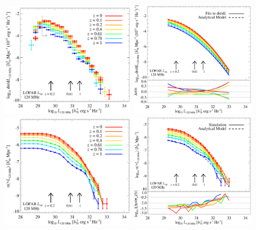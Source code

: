 \documentclass[traditabstract]{aa}
\begin{document}
\begin{figure}[hbt!]
\centering
\includegraphics[width=0.5\textwidth,height=0.305\textheight]{figures/RLF_LOFAR.eps}
\includegraphics[width=0.47\textwidth,height=0.3\textheight]{figures/RLF_LOFAR_analytical_1.eps}
\includegraphics[width=0.5\textwidth,height=0.305\textheight]{figures/CumDensityL_LOFAR.eps}
\includegraphics[width=0.47\textwidth,height=0.3\textheight]{figures/CumDensityL_LOFAR_1.eps}

\end{figure}
\end{document}

